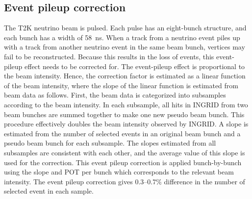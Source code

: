 \documentclass[%
 reprint,
superscriptaddress,
 amsmath,amssymb,
 aps,
]{revtex4-1}
\begin{document}
\subsection{Event pileup correction}
The T2K neutrino beam is pulsed. Each pulse has an eight-bunch structure, and each bunch has a width of 58~ns.
When a track from a neutrino event piles up with a track from another neutrino event in the same beam bunch, vertices may fail to be reconstructed.
Because this results in the loss of events, this event-pileup effect needs to be corrected for.
The event-pileup effect is proportional to the beam intensity.
Hence, the correction factor is estimated as a linear function of the beam intensity, where
the slope of the linear function is estimated from beam data as follows.
First, the beam data is categorized into subsamples according to the beam intensity.
In each subsample, all hits in INGRID from two beam bunches are summed together to make one new pseudo beam bunch.
This procedure effectively doubles the beam intensity observed by INGRID.
A slope is estimated from the number of selected events in an original beam bunch and a pseudo beam bunch for each subsample.
The slopes estimated from all subsamples are consistent with each other, and the average value of this slope is used for the correction.
This event pileup correction is applied bunch-by-bunch using the slope and POT per bunch which corresponds to the relevant beam intensity.
The event pileup correction gives 0.3--0.7\% difference in the number of selected event in each sample.
\end{document}
